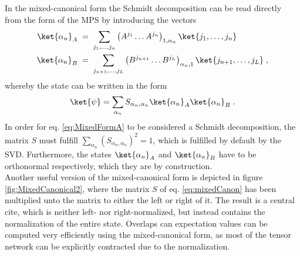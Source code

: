 In the mixed-canonical form the Schmidt decomposition can be read directly from the form of the MPS by introducing the vectors
\begin{align}
 	\ket{\alpha_n}_A \; &= \; \sum_{j_1 , \ldots , j_n} \left( A^{j_1} \ldots A^{j_n} \right)_{1,\alpha_n} \ket{j_1 , \ldots , j_n}  \label{eq:mixedA} \\
 	\ket{\alpha_n}_B \; &= \; \sum_{j_{n+1} , \ldots , j_L} \left( B^{j_{n+1}} \ldots B^{j_L} \right)_{\alpha_n , 1} \ket{j_{n+1} , \ldots , j_L} \; , \label{eq:mixedB}
\end{align}
whereby the state can be written in the form
\begin{equation}
	\ket{\psi} = \sum_{\alpha_n} S_{\alpha_n , \alpha_n} \ket{\alpha_n}_A \ket{\alpha_n}_B \; . \label{eq:MixedFormA}
\end{equation}
In order for eq. \eqref{eq:MixedFormA} to be considered a Schmidt decomposition, the matrix $S$ must fulfill $\sum_{\alpha_n} (S_{\alpha_n , \alpha_n})^2 = 1$, which is fulfilled by default by the SVD. Furthermore, the states $\ket{\alpha_n}_A$ and $\ket{\alpha_n}_B$ have to be orthonormal respectively, which they are by construction.\\
Another useful version of the mixed-canonical form is depicted in figure \ref{fig:MixedCanonical2}, where the matrix $S$ of eq. \eqref{eq:mixedCanon} has been multiplied unto the matrix to either the left or right of it. The result is a central cite, which is neither left- nor right-normalized, but instead contains the normalization of the entire state. Overlaps can expectation values can be computed very efficiently using the mixed-canonical form, as most of the tensor network can be explicitly contracted due to the normalization. 
 

